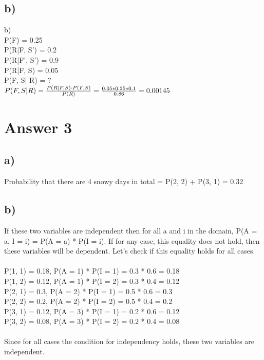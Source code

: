 \documentclass[12pt]{article}
\begin{document}
\subsection*{b)}b)\\P(F) = 0.25\\P(R|F, S') = 0.2\\P(R|F', S') = 0.9\\P(R|F, S) = 0.05\\P(F, S| R) = ?\\
$
P(F, S| R) = \frac{P(R| F, S)\cdot P(F, S)}{P(R)}\\
= \frac{0.05 * 0.25 * 0.1}{0.86} = 0.00145$

\section*{Answer 3}
\subsection*{a)} Probability that there are 4 snowy days in total = P(2, 2) + P(3, 1) = 0.32
\subsection*{b)} If these two variables are independent then for all a and i in the domain, P(A = a, I = i) = P(A = a) * P(I = i). If for any case, this equality does not hold, then these variables will be dependent. Let's check if this equality holds for all cases.\\\\
P(1, 1) = 0.18, P(A = 1) * P(I = 1) = 0.3 * 0.6 = 0.18\\
P(1, 2) = 0.12, P(A = 1) * P(I = 2) = 0.3 * 0.4 = 0.12\\
P(2, 1) = 0.3, P(A = 2) * P(I = 1) = 0.5 * 0.6 = 0.3\\
P(2, 2) = 0.2, P(A = 2) * P(I = 2) = 0.5 * 0.4 = 0.2\\
P(3, 1) = 0.12, P(A = 3) * P(I = 1) = 0.2 * 0.6 = 0.12\\
P(3, 2) = 0.08, P(A = 3) * P(I = 2) = 0.2 * 0.4 = 0.08\\\\
Since for all cases the condition for independency holds, these two variables are independent.
\end{document}
